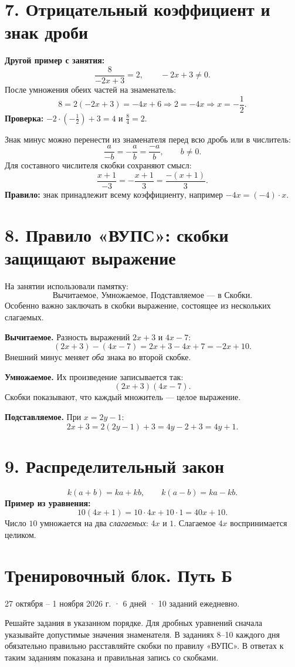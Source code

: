\documentclass[a4paper,12pt]{article}
\newcommand{\beware}[1]{\textcolor{warn}{\textbf{#1}}}
\newcommand{\sect}[1]{\section*{#1}\vspace{-3mm}}
\begin{document}
\sect{7. Отрицательный коэффициент и знак дроби}
\textbf{Другой пример с занятия:}
\[
\frac{8}{-2x+3}=2,\qquad -2x+3\ne0.
\]
После умножения обеих частей на знаменатель:
\[
8=2(-2x+3)=-4x+6
\Longrightarrow 2=-4x
\Longrightarrow \boxed{x=-\frac12}.
\]
\textbf{Проверка:} $-2\cdot(-\frac12)+3=4$ и $\frac84=2$.

Знак минус можно перенести из знаменателя перед всю дробь или в числитель:
\[
\frac{a}{-b}=-\frac ab=\frac{-a}{b},\qquad b\ne0.
\]
Для составного числителя скобки сохраняют смысл:
\[
\frac{x+1}{-3}=-\frac{x+1}{3}=\frac{-(x+1)}{3}.
\]
\beware{Правило:} знак принадлежит всему коэффициенту, например $-4x=(-4)\cdot x$.

\sect{8. Правило «ВУПС»: скобки защищают выражение}
На занятии использовали памятку:
\[
\boxed{\text{Вычитаемое, Умножаемое, Подставляемое --- в Скобки.}}
\]
Особенно важно заключать в скобки выражение, состоящее из нескольких слагаемых.

\textbf{Вычитаемое.} Разность выражений $2x+3$ и $4x-7$:
\[
(2x+3)-(4x-7)=2x+3-4x+7=\boxed{-2x+10}.
\]
Внешний минус меняет \emph{оба} знака во второй скобке.

\textbf{Умножаемое.} Их произведение записывается так:
\[
\boxed{(2x+3)(4x-7)}.
\]
Скобки показывают, что каждый множитель --- целое выражение.

\textbf{Подставляемое.} При $x=2y-1$:
\[
2x+3=2(2y-1)+3=4y-2+3=\boxed{4y+1}.
\]

\sect{9. Распределительный закон}
\[
\boxed{k(a+b)=ka+kb},\qquad \boxed{k(a-b)=ka-kb}.
\]
\textbf{Пример из уравнения:}
\[
10(4x+1)=10\cdot4x+10\cdot1=40x+10.
\]
Число $10$ умножается на два \emph{слагаемых}: $4x$ и $1$. Слагаемое $4x$ воспринимается целиком.

\clearpage
\section*{Тренировочный блок. Путь Б}
\textcolor{muted}{27 октября -- 1 ноября 2026 г. · 6 дней · 10 заданий ежедневно.}

Решайте задания в указанном порядке. Для дробных уравнений сначала указывайте допустимые значения знаменателя. В заданиях 8--10 каждого дня обязательно правильно расставляйте скобки по правилу «ВУПС». В ответах к таким заданиям показана и правильная запись со скобками.
\end{document}
